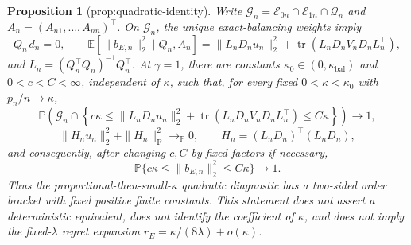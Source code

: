 \documentclass{article}
\newtheorem{proposition}{Proposition}
\begin{document}
\begin{proposition}[prop:quadratic-identity]\label{prop:quadratic-identity}
Write \(\mathcal G_n=\mathcal E_{0n}\cap\mathcal E_{1n}\cap\mathcal Q_n\) and \(A_n=(A_{n1},\ldots,A_{nn})^\top\).  On \(\mathcal G_n\), the unique exact-balancing weights imply
\[
 Q_n^\top d_n=0,
 \qquad
 \mathbb E[\|b_{E,n}\|_2^2\mid Q_n,A_n]
 =\|L_nD_nu_n\|_2^2+
 \operatorname{tr}(L_nD_nV_nD_nL_n^\top),
\]
and \(L_n=(Q_n^\top Q_n)^{-1}Q_n^\top\).  At \(\gamma=1\), there are constants \(\kappa_0\in(0,\kappa_{\mathrm{bal}})\) and \(0<c<C<\infty\), independent of \(\kappa\), such that, for every fixed \(0<\kappa<\kappa_0\) with \(p_n/n\to\kappa\),
\[
 \mathbb P\!\left(
 \mathcal G_n\cap
 \left\{c\kappa\le
 \|L_nD_nu_n\|_2^2+
 \operatorname{tr}(L_nD_nV_nD_nL_n^\top)
 \le C\kappa\right\}\right)\longrightarrow1,
\]
\[
 \|H_nu_n\|_2^2+\|H_n\|_{\mathrm F}^2
 \longrightarrow_{\mathbb P}0,
 \qquad H_n=(L_nD_n)^\top(L_nD_n),
\]
and consequently, after changing \(c,C\) by fixed factors if necessary,
\[
 \mathbb P\{c\kappa\le\|b_{E,n}\|_2^2\le C\kappa\}
 \longrightarrow1.
\]
Thus the proportional-then-small-\(\kappa\) quadratic diagnostic has a two-sided order bracket with fixed positive finite constants.  This statement does not assert a deterministic equivalent, does not identify the coefficient of \(\kappa\), and does not imply the fixed-\(\lambda\) regret expansion \(r_E=\kappa/(8\lambda)+o(\kappa)\).
\end{proposition}
\end{document}
